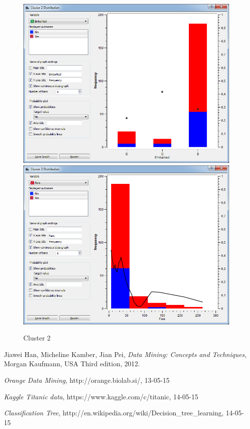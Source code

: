 \documentclass[a4paper,11pt]{article}
\begin{document}
\begin{figure}[h]
\begin{center}
		\includegraphics[scale=0.30]{ClusterDistribution/Cluster2/Embarked}
		\includegraphics[scale=0.30]{ClusterDistribution/Cluster2/Fare}
	\end{center}
	\caption{Cluster 2}
	\label{ClusterTwo}
\end{figure}

\begin{thebibliography}{9}

	Jiawei Han, 
	Micheline Kamber, 
	Jian Pei,
	\emph{Data Mining: Concepts and Techniques},
	Morgan Kaufmann, USA	
	Third edition,
	2012.
	

  \emph{Orange Data Mining},
  http://orange.biolab.si/,
  13-05-15
  
	\emph{Kaggle Titanic data},
	https://www.kaggle.com/c/titanic,
	14-05-15
	

	\emph{Classification Tree},
	http://en.wikipedia.org/wiki/Decision\_tree\_learning,
	14-05-15
	
	
	
\end{thebibliography}
\end{document}
